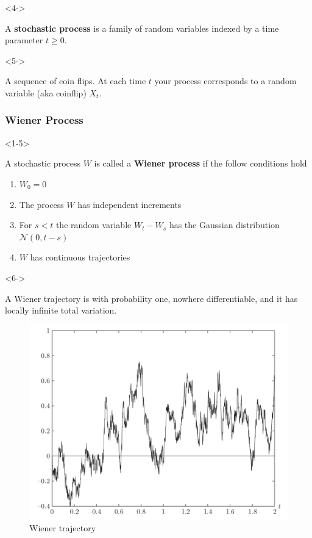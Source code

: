 \documentclass[10pt]{beamer}
\begin{document}
\begin{frame}[t]
    \begin{onlyenv}<4->
      \begin{definition}
        A \textbf{stochastic process} is a family of random variables indexed by a time parameter $t \geq 0$.
      \end{definition}
    \end{onlyenv}
    \begin{onlyenv}<5->
      \begin{example}
        A sequence of coin flips. At each time $t$ your process corresponds to a random variable (aka coinflip) $X_t$.
      \end{example}
    \end{onlyenv}
\end{frame}


\begin{frame}[t]
  \frametitle{Wiener Process}
  \begin{onlyenv}<1-5>
  \begin{definition}
    A stochastic process $W$ is called a \textbf{Wiener process} if the follow conditions hold
    \begin{enumerate}
      \item<2-> $W_0 = 0$
      \item<3-> The process $W$ has independent increments
      \item<4-> For $s < t$ the random variable $W_t - W_s$ has the Gaussian distribution $\mathcal{N}(0,t-s)$
      \item<5-> $W$ has continuous trajectories
    \end{enumerate}
  \end{definition}
  \end{onlyenv}
  \begin{onlyenv}<6->
    \begin{theorem}
      A Wiener trajectory is with probability one, nowhere differentiable, and it has locally infinite total variation.
    \end{theorem}
    \begin{figure}
      \includegraphics[scale=.45]{./graphics/wiener-trajectory.png}
      \caption{Wiener trajectory}
    \end{figure}
  \end{onlyenv}
\end{frame}
\end{document}

